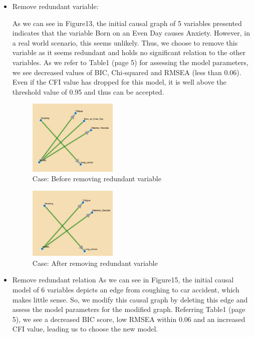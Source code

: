 \documentclass{vgtc}                          %
\begin{document}
\begin{itemize}
\item Remove redundant variable: 

    As we can see in Figure13, the initial causal graph of 5 variables presented indicates
    that the variable Born on an Even Day causes Anxiety. However, in a real world scenario, this seems unlikely. Thus, we choose to remove this variable as it seems redundant and holds no significant relation to the other variables. As we refer to Table1 (page 5) for assessing the model parameters, we see decreased values of BIC, Chi-squared and RMSEA (less than 0.06). Even if the CFI value has dropped for this model, it is well above the threshold value of 0.95 and thus can be accepted.
    
    \begin{figure}[H]
      \caption{Case: Before removing redundant variable}
      \centering
      \includegraphics[width=0.4\textwidth]{c5_2}
    \end{figure}
    
    \begin{figure}[H]
      \caption{Case: After removing redundant variable}
      \centering
      \includegraphics[width=0.4\textwidth]{c5_1}
    \end{figure}
    
    
\item Remove redundant relation
    As we can see in Figure15, the initial causal model of 6 variables depicts an edge from coughing to car accident, which makes little sense. So, we modify this causal graph by deleting this edge and assess the model parameters for the modified graph. Referring  Table1 (page 5), we see a decreased BIC score, low RMSEA within 0.06 and an increased CFI value, leading us to choose the new model.
    

\end{itemize}
\end{document}
